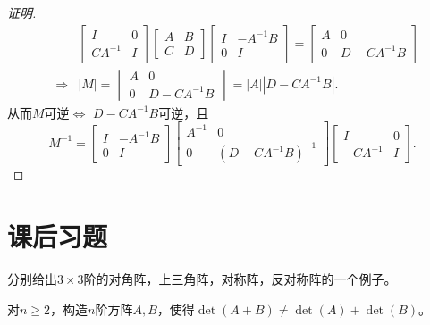 \begin{proof}[证明]
\begin{eqnarray*}
& & \begin{bmatrix} I & 0 \\ CA^{-1} & I \end{bmatrix} \begin{bmatrix} A & B \\ C & D \end{bmatrix} \begin{bmatrix} I & -A^{-1}B \\ 0 & I \end{bmatrix} = \begin{bmatrix} A & 0 \\ 0 & D-CA^{-1}B \end{bmatrix} \\
& \Longrightarrow & |M| = \begin{vmatrix} A & 0 \\ 0 & D-CA^{-1}B \end{vmatrix} = |A||D-CA^{-1}B|.
\end{eqnarray*}
从而$M$可逆$\Longleftrightarrow$ $D-CA^{-1}B$可逆，且
$$M^{-1} = \begin{bmatrix} I & -A^{-1}B \\ 0 & I \end{bmatrix} \begin{bmatrix} A^{-1} & 0 \\ 0 & (D-CA^{-1}B)^{-1} \end{bmatrix} \begin{bmatrix} I & 0 \\ -CA^{-1} & I \end{bmatrix}.$$
\end{proof}


\section{课后习题}

\begin{ex} \label{ex:3.1}
分别给出$3\times3$阶的对角阵，上三角阵，对称阵，反对称阵的一个例子。
\end{ex}

\begin{ex} \label{ex:3.2}
对$n \geqslant 2$，构造$n$阶方阵$A,B$，使得$\det(A+B)\neq\det(A)+\det(B)$。
\end{ex}


